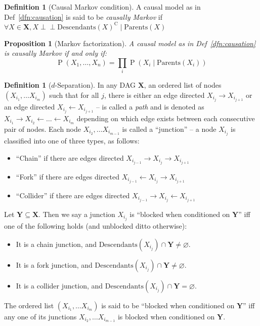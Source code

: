 \documentclass[12pt]{article}
\newcommand{\ci}{\perp\!\!\!\perp}
\newcommand{\Prob}[1]{\operatorname{P}\left(#1\right)}
\newtheorem{prop}[thm]{Proposition}
\theoremstyle{definition}
\newtheorem{dfn}[thm]{Definition}
\numberwithin{equation}{section}
\numberwithin{figure}{section}
\numberwithin{table}{section}
\begin{document}
\begin{dfn}[Causal Markov condition]
    \label{dfn:causation-markov}
    A causal model as in Def~\ref{dfn:causation} is said to be \emph{causally Markov} if $\forall X\in\mathbf{X}, X\ci \mathrm{Descendants}(X)^{\mathrm{C}}\mid\mathrm{Parents}(X)$
\end{dfn}

\begin{prop}[Markov factorization]
    \label{prop:causation-mf}
    A causal model as in Def~\ref{dfn:causation} is causally Markov if and only if:
    \begin{equation*}
        \Prob{X_1,\dots,X_n} = \prod_i \Prob{X_i\mid \mathrm{Parents}(X_i)}
    \end{equation*}
\end{prop}

\begin{dfn}[$d$-Separation]
    \label{dfn:causation-dsep}
    In any DAG $\mathbf{X}$, an ordered list of nodes $(X_{i_1}, \dots X_{i_m})$ such that for all $j$, there is either an edge directed $X_{i_j}\rightarrow X_{i_{j+1}}$ or an edge directed $X_{i_j}\leftarrow X_{i_{j+1}}$ -- is called a \emph{path} and is denoted as $X_{i_1}\to X_{i_2} \leftarrow \dots \leftarrow X_{i_m}$ depending on which edge exists between each consecutive pair of nodes. Each node $X_{i_2},\dots X_{i_{m-1}}$ is called a ``junction'' -- a node $X_{i_j}$ is classified into one of three types, as follows:
    \begin{itemize}
        \item ``Chain'' if there are edges directed $X_{i_{j-1}}\rightarrow X_{i_{j}}\rightarrow X_{i_{j+1}}$
        \item ``Fork'' if there are edges directed $X_{i_{j-1}}\leftarrow X_{i_{j}}\rightarrow X_{i_{j+1}}$
        \item ``Collider'' if there are edges directed $X_{i_{j-1}}\rightarrow X_{i_{j}}\leftarrow X_{i_{j+1}}$
    \end{itemize}
    Let $\mathbf{Y}\subseteq \mathbf{X}$. Then we say a junction $X_{i_j}$ is ``blocked when conditioned on $\mathbf{Y}$'' iff one of the following holds (and unblocked ditto otherwise):
    \begin{itemize}
        \item It is a chain junction, and $\mathrm{Descendants}(X_{i_j})\cap\mathbf{Y}\ne\varnothing$.
        \item It is a fork junction, and $\mathrm{Descendants}(X_{i_j})\cap\mathbf{Y}\ne\varnothing$.
        \item It is a collider junction, and $\mathrm{Descendants}(X_{i_j})\cap\mathbf{Y}=\varnothing$.
    \end{itemize}
    The ordered list $(X_{i_1}, \dots X_{i_m})$ is said to be ``blocked when conditioned on $\mathbf{Y}$'' iff any one of its junctions $X_{i_2},\dots X_{i_{m-1}}$ is blocked when conditioned on $\mathbf{Y}$. 
    

\end{dfn}
\end{document}
